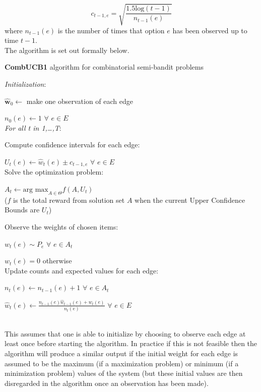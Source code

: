 $$c_{t-1,e}=\sqrt{\frac{1.5\textrm{log}(t-1)}{n_{t-1}(e)}}$$ where $n_{t-1}(e)$ is the number of times that option $e$ has been observed up to time $t-1$.\\

The algorithm is set out formally below.

\noindent \hrulefill

\noindent \textbf{CombUCB1} algorithm for combinatorial semi-bandit problems

\noindent \hrulefill

\noindent \textit{Initialization}:

$\mathbf{\hat{w}}_0 \leftarrow$ make one observation of each edge

$n_0(e) \leftarrow 1$ $\forall$ $e \in E$\\

\noindent \textit{For all t in 1,\ldots,T}:

Compute confidence intervals for each edge:

\indent \indent $U_t(e) \leftarrow \hat{w}_t(e)\pm c_{t-1,e}$ $\forall$ $e \in E$\\

Solve the optimization problem:

\indent \indent $A_t \leftarrow \textrm{arg max}_{A\in \Theta}f(A,U_t)$\\

($f$ is the total reward from solution set $A$ when the current Upper Confidence Bounds are $U_t$)

Observe the weights of chosen items:

\indent \indent $w_t(e) \sim P_e$ $\forall$ $e \in A_t$

\indent \indent $w_t(e)=0$ otherwise\\

Update counts and expected values for each edge:

\indent \indent $n_t(e) \leftarrow n_{t-1}(e) + 1$ $\forall$ $e \in A_t$

\indent \indent $\hat{w}_t(e) \leftarrow \frac{n_{t-1}(e)\hat{w}_{t-1}(e)+w_t(e)}{n_t(e)}$ $\forall$ $e \in E$

\noindent \hrulefill\\

This assumes that one is able to initialize by choosing to observe each edge at least once before starting the algorithm. In practice if this is not feasible then the algorithm will produce a similar output if the initial weight for each edge is assumed to be the maximum (if a maximization problem) or minimum (if a minimization problem) values of the system (but these initial values are then disregarded in the algorithm once an observation has been made).\\

